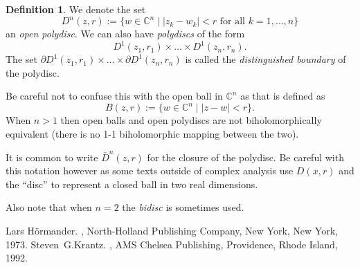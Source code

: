 \documentclass[12pt]{article}
\theoremstyle{theorem}
\theoremstyle{definition}
\newtheorem*{defn}{Definition}
\begin{document}
\begin{defn}
We denote the set
\begin{equation*}
D^n(z,r) := \{ w \in {\mathbb{C}}^n \mid \lvert z_k - w_k \rvert < r
\text{ for all } k = 1,\ldots,n \}
\end{equation*}
an {\em open polydisc}.  We can also have {\em polydiscs} of the form
\begin{equation*}
D^1(z_1,r_1) \times \ldots \times D^1(z_n,r_n) .
\end{equation*}
The set $\partial D^1(z_1,r_1) \times \ldots \times \partial D^1(z_n,r_n)$ is called the {\em distinguished boundary} of the polydisc.
\end{defn}

Be careful not to confuse this with the open ball in ${\mathbb{C}}^n$
as that is defined as
\begin{equation*}
B(z,r) := \{ w \in {\mathbb{C}}^n \mid \lvert z - w \rvert < r \} .
\end{equation*}
When $n > 1$ then open balls and open polydiscs are not biholomorphically
equivalent (there is no 1-1 biholomorphic mapping between the two).

It is common to write $\bar{D}^n(z,r)$ for the closure of the polydisc.
Be careful with this notation however as some texts outside of
complex analysis use $D(x,r)$ and
the  ``disc'' to represent a closed ball in two real dimensions.

Also note that when $n=2$ the  {\em bidisc} is sometimes used.

\begin{thebibliography}{9}
Lars H\"ormander.
{\em {}},
North-Holland Publishing Company, New York, New York, 1973.
Steven~G.\@ Krantz.
{\em {}},
AMS Chelsea Publishing, Providence, Rhode Island, 1992.
\end{thebibliography}
\end{document}
